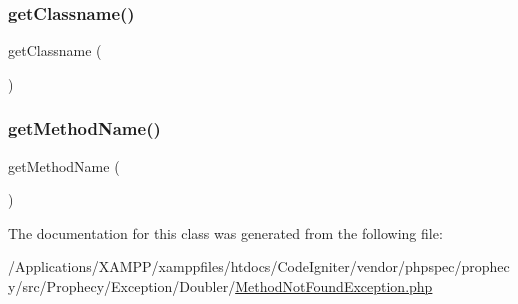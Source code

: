 \subsubsection{\texorpdfstring{get\+Classname()}{getClassname()}}
{\footnotesize\ttfamily get\+Classname (\begin{DoxyParamCaption}{ }\end{DoxyParamCaption})}

\mbox{\label{class_prophecy_1_1_exception_1_1_doubler_1_1_method_not_found_exception_a0fa2079426d0262e759c4105fa4e9163}} 
\subsubsection{\texorpdfstring{get\+Method\+Name()}{getMethodName()}}
{\footnotesize\ttfamily get\+Method\+Name (\begin{DoxyParamCaption}{ }\end{DoxyParamCaption})}



The documentation for this class was generated from the following file\+:\begin{DoxyCompactItemize}
\item 
/\+Applications/\+X\+A\+M\+P\+P/xamppfiles/htdocs/\+Code\+Igniter/vendor/phpspec/prophecy/src/\+Prophecy/\+Exception/\+Doubler/\mbox{\hyperlink{_method_not_found_exception_8php}{Method\+Not\+Found\+Exception.\+php}}\end{DoxyCompactItemize}
